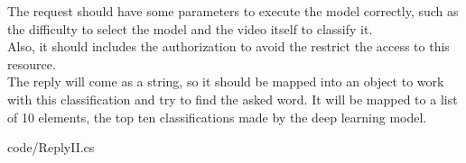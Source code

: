     The request should have some parameters to execute the model correctly, such as the difficulty to select the model and the video itself to classify it. \\
    Also, it should includes the authorization to avoid the restrict the access to this resource. \\

    The reply will come as a string, so it should be mapped into an object to work with this classification and try to find the asked word. It will be mapped to a list \\
    of 10 elements, the top ten classifications made by the deep learning model.
    
    {code/ReplyII.cs}


